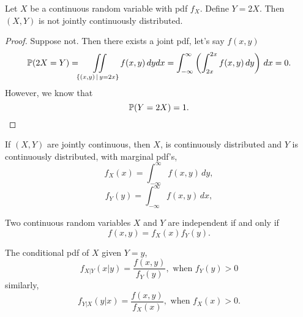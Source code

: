 \documentclass[10pt, a4paper]{article}
\begin{document}
\begin{example}
    Let $X$ be a continuous random variable with pdf $f_X$.
    Define $Y = 2X$.
    Then $(X, Y)$ is not jointly continuously distributed.
    \begin{proof}
        Suppose not.
        Then there exists a joint pdf,
        let's say $f(x, y)$
        \[
        \P(2X = Y) = \iint\limits_{\{(x, y)\,|\,y = 2x\}}f(x, y)\,dydx = \int_{-\infty}^{\infty}\left(\int_{2x}^{2x}f(x, y)\,dy\right)\,dx = 0.
        \]
        However,
        we know that
        \[
        \P(Y = 2X) = 1.
        \]
    \end{proof}
\end{example}

\begin{theorem}
    If $(X, Y)$ are jointly continuous,
    then $X$,
    is continuously distributed and $Y$ is continuously distributed,
    with marginal pdf's,
    \[
    f_X(x) = \int_{-\infty}^{\infty}f(x, y)\,dy,
    \]
    \[
    f_Y(y) = \int_{-\infty}^{\infty}f(x, y)\,dx,
    \]
\end{theorem}

\begin{lemma}
    Two continuous random variables $X$ and $Y$ are independent if and only if
    \[
    f(x, y) = f_X(x)f_Y(y).
    \]
\end{lemma}

The conditional pdf of $X$ given $Y = y$,
\[
f_{X | Y}(x | y) = \frac{f(x, y)}{f_Y(y)},\text{ when } f_Y(y) > 0
\]
similarly,
\[
f_{Y | X}(y | x) = \frac{f(x, y)}{f_X(x)},\text{ when } f_X(x) > 0.
\]
\end{document}
